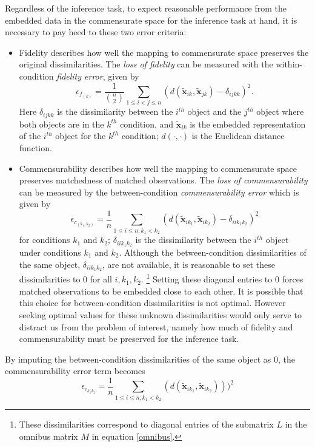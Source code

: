 \documentclass[12pt,oneside,final]{thesis}
\begin{document}
Regardless of the inference task,  to expect reasonable performance from the embedded data in the commensurate space  for the inference task at hand, 
it is necessary to pay heed to these two error criteria: %
\begin{itemize}
\item Fidelity describes how well the mapping to commensurate space preserves the original dissimilarities. The \emph{loss of fidelity} can be measured with the  within-condition \emph{ fidelity error}, given by
    \[
\epsilon_{f_{(k)}} = \frac{1}{{{n}\choose{2}}} \sum_{1 \leq i < j \leq n} (d(\widetilde{\bm{x}}_{ik},\widetilde{\bm{x}}_{jk})-\delta_{ijkk})^2
.\] 
Here $\delta_{ijkk}$ is the dissimilarity between the $i^{th}$ object and the $j^{th}$ object where both objects are in the $k^{th}$  condition, and $\widetilde{\bm{x}}_{ik}$ is the embedded representation of the $i^{th}$ object  for the $k^{th}$ condition;  $d(\cdot,\cdot)$ is the Euclidean distance function.

\item Commensurability describes how well the mapping to commensurate space preserves matchedness of matched observations. The \emph{loss of commensurability} can be measured by the between-condition {\em commensurability error} which is given by
    \[
\epsilon_{c_{(k_1,k_2)}} = \frac{1}{n} \sum_{1 \leq i \leq n;k_1 <k_2} (d(\widetilde{\bm{x}}_{ik_1},\widetilde{\bm{x}}_{ik_2})- { \delta_{iik_1k_2}})^2
\label{comm-error}
\]
 for conditions $k_1$ and $k_2$; $\delta_{iik_1k_2}$  is the dissimilarity between the $i^{th}$ object under  conditions   $k_1$ and  $k_2$. 
Although  the between-condition dissimilarities of the same object, ${ \delta_{iik_1k_2}}$, are not available,  it is reasonable to set these dissimilarities to $0$ for all $i,k_1,k_2$. \footnote{These dissimilarities correspond to  diagonal  entries of the  submatrix $L$ in  the omnibus matrix  $M$ in equation \eqref{omnibus}.} Setting these diagonal entries to $0$ forces matched observations to be embedded close to each other. It is possible that this choice for between-condition dissimilarities is not  optimal. However seeking optimal values for these unknown dissimilarities would only serve to distract us from the problem of interest, namely how much of fidelity and commensurability must be preserved for the inference task.
\label{commens}  
\end{itemize}
By imputing the between-condition dissimilarities of the same object as 0, the commensurability error  term becomes
  \[
\epsilon_{c_{k_1k_2}} = \frac{1}{n} \sum_{1 \leq i \leq n;k_1< k_2} (d(\widetilde{\bm{x}}_{ik_1},\widetilde{\bm{x}}_{ik_2})))^2
\]
\end{document}
